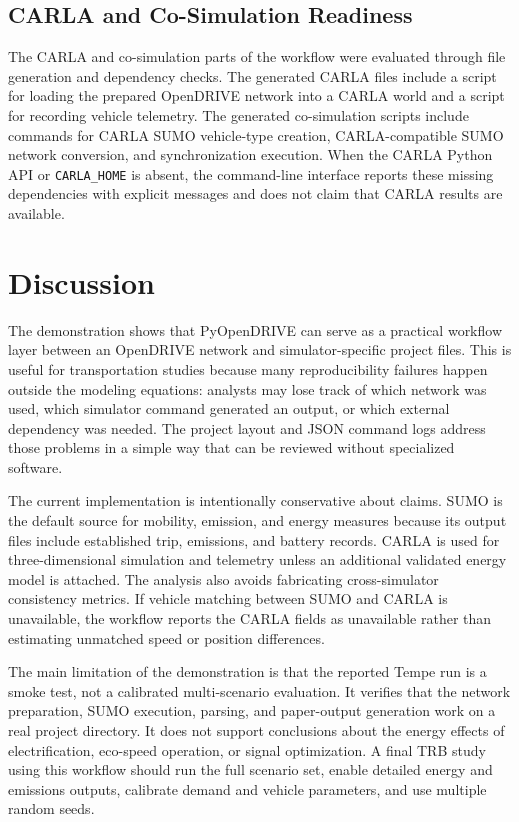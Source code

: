 \documentclass[10pt,numbered]{\selectedmanuscriptclass}
\begin{document}
\subsection{CARLA and Co-Simulation Readiness}

The CARLA and co-simulation parts of the workflow were evaluated through file
generation and dependency checks. The generated CARLA files include a script for
loading the prepared OpenDRIVE network into a CARLA world and a script for
recording vehicle telemetry. The generated co-simulation scripts include
commands for CARLA SUMO vehicle-type creation, CARLA-compatible SUMO network
conversion, and synchronization execution. When the CARLA Python API or
\texttt{CARLA\_HOME} is absent, the command-line interface reports these missing
dependencies with explicit messages and does not claim that CARLA results are
available.

\section{Discussion}\label{sec:discussion}

The demonstration shows that PyOpenDRIVE can serve as a practical workflow layer
between an OpenDRIVE network and simulator-specific project files. This is
useful for transportation studies because many reproducibility failures happen
outside the modeling equations: analysts may lose track of which network was
used, which simulator command generated an output, or which external dependency
was needed. The project layout and JSON command logs address those problems in a
simple way that can be reviewed without specialized software.

The current implementation is intentionally conservative about claims. SUMO is
the default source for mobility, emission, and energy measures because its output
files include established trip, emissions, and battery records. CARLA is used
for three-dimensional simulation and telemetry unless an additional validated
energy model is attached. The analysis also avoids fabricating cross-simulator
consistency metrics. If vehicle matching between SUMO and CARLA is unavailable,
the workflow reports the CARLA fields as unavailable rather than estimating
unmatched speed or position differences.

The main limitation of the demonstration is that the reported Tempe run is a
smoke test, not a calibrated multi-scenario evaluation. It verifies that the
network preparation, SUMO execution, parsing, and paper-output generation work
on a real project directory. It does not support conclusions about the energy
effects of electrification, eco-speed operation, or signal optimization. A final
TRB study using this workflow should run the full scenario set, enable detailed
energy and emissions outputs, calibrate demand and vehicle parameters, and use
multiple random seeds.
\end{document}
